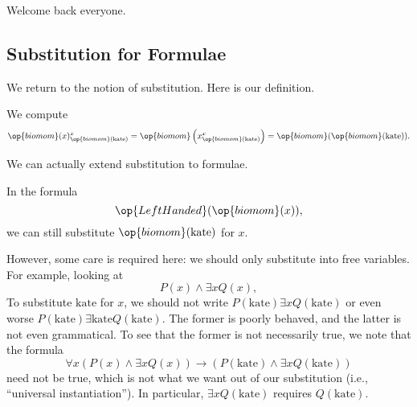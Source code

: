 
Welcome back everyone.

\subsection{Substitution for Formulae}
We return to the notion of substitution. Here is our definition.
\subdef*
\begin{example}
	We compute
	\[\op{biomom}(x)^x_{\op{biomom}(\mathrm{kate})}=\op{biomom}\left(x^x_{\op{biomom}(\mathrm{kate})}\right)=\op{biomom}(\op{biomom}(\mathrm{kate})).\]
\end{example}
We can actually extend substitution to formulae.
\begin{example}
	In the formula
	\[\op{LeftHanded}(\op{biomom}(x)),\]
	we can still substitute $\op{biomom}(\mathrm{kate})$ for $x$.
\end{example}
However, some care is required here: we should only substitute into free variables. For example, looking at
\[P(x)\land\exists xQ(x),\]
To substitute $\mathrm{kate}$ for $x$, we should not write $P(\mathrm{kate})\exists xQ(\mathrm{kate})$ or even worse $P(\mathrm{kate})\exists\mathrm{kate}Q(\mathrm{kate})$. The former is poorly behaved, and the latter is not even grammatical. To see that the former is not necessarily true, we note that the formula
\[\forall x(P(x)\land\exists xQ(x))\to(P(\mathrm{kate})\land\exists xQ(\mathrm{kate}))\]
need not be true, which is not what we want out of our substitution (i.e., ``universal instantiation''). In particular, $\exists xQ(\mathrm{kate})$ requires $Q(\mathrm{kate})$.

